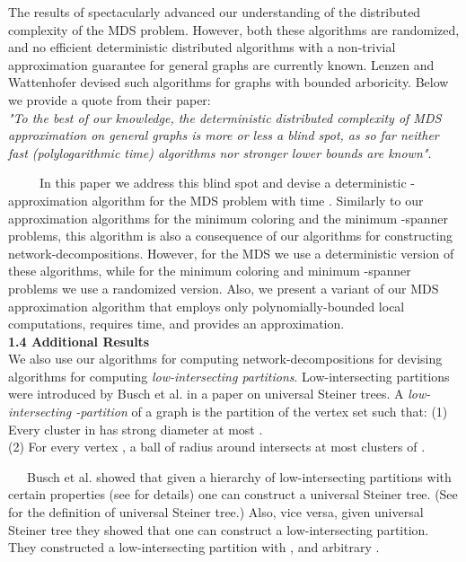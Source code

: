 \documentclass[11pt]{article}
\begin{document}
The results of \cite{JRS01,KW05} spectacularly advanced our understanding of the distributed complexity of the MDS problem. However, both these algorithms \cite{JRS01,KW05} are randomized, and no efficient deterministic distributed algorithms with a non-trivial approximation guarantee for general graphs are currently known. Lenzen and Wattenhofer \cite{LW10} devised such algorithms for graphs with bounded arboricity. Below we provide a quote from their paper: \\
\textit{"To the best of our knowledge, the deterministic distributed complexity of MDS approximation on general graphs is more or less a blind spot, as so far neither fast (polylogarithmic time) algorithms nor stronger lower bounds are known"}.

\noindent \ \ \ \ \ In this paper we address this blind spot and devise a deterministic -approximation algorithm for the MDS problem with time . Similarly to our approximation algorithms for the minimum coloring and the minimum -spanner problems, this algorithm is also a consequence of our algorithms for constructing network-decompositions. However, for the MDS we use a deterministic version of these algorithms, while for the minimum coloring and minimum -spanner problems we use a randomized version. Also, we present a variant of our MDS approximation algorithm that employs only polynomially-bounded local computations, requires  time, and provides an  approximation.\\ 
{\bf 1.4 Additional Results \\}
We also use our algorithms for computing network-decompositions for devising algorithms for computing {\em low-intersecting partitions}. Low-intersecting partitions were introduced by Busch et al. \cite{BDRRS12} in a paper on universal Steiner trees.
A {\em low-intersecting -partition}  of a graph  is the partition of the vertex set  such that: 
(1) Every cluster  in  has strong diameter at most . \\
(2) For every vertex , a ball  of radius  around  intersects at most  clusters of . 

 \ \ \ Busch et al. showed that given a hierarchy of low-intersecting partitions with certain properties (see \cite{BDRRS12} for details) one can construct a universal Steiner tree. (See \cite{BDRRS12} for the definition of universal Steiner tree.) Also, vice versa, given universal Steiner tree they showed that one can construct a low-intersecting partition. They constructed a low-intersecting partition with , and arbitrary .
\end{document}
